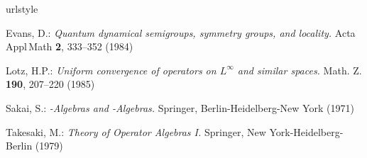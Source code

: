 %
\begin{thebibliography}{1}
\providecommand{\url}[1]{{#1}}
\providecommand{\urlprefix}{URL }
\expandafter\ifx\csname urlstyle\endcsname\relax
  \providecommand{\doi}[1]{DOI~\discretionary{}{}{}#1}\else
  \providecommand{\doi}{DOI~\discretionary{}{}{}\begingroup
  \urlstyle{rm}\Url}\fi

Evans, D.: \emph{Quantum dynamical semigroups, symmetry groups, and locality.}
\newblock Acta\,Appl\,Math \textbf{2}, 333--352 (1984)

Lotz, H.P.: \emph{Uniform convergence of operators on {$L^{\infty}$} and similar spaces.}
\newblock Math. Z. \textbf{190}, 207--220 (1985)

Sakai, S.: \emph{\CA-Algebras and \WA-Algebras.}
\newblock Springer, Berlin-Heidelberg-New York (1971)

Takesaki, M.: \emph{Theory of Operator Algebras {I}.}
\newblock Springer, New York-Heidelberg-Berlin (1979)

\end{thebibliography}
